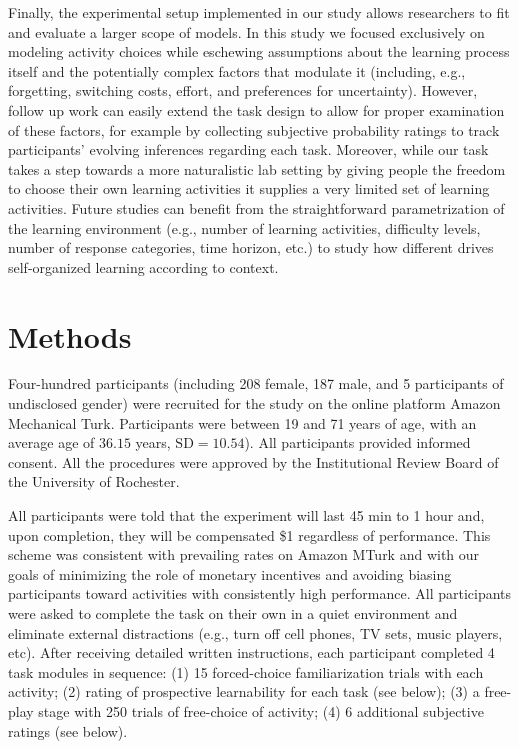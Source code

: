     Finally, the experimental setup implemented in our study allows researchers to fit and evaluate a larger scope of models. In this study we focused exclusively on modeling activity choices while eschewing assumptions about the learning process itself and the potentially complex factors that modulate it (including, e.g., forgetting, switching costs, effort, and preferences for uncertainty). However, follow up work can easily extend the task design to allow for proper examination of these factors, for example by collecting subjective probability ratings to track participants' evolving inferences regarding each task. Moreover, while our task takes a step towards a more naturalistic lab setting by giving people the freedom to choose their own learning activities it supplies a very limited set of learning activities. Future studies can benefit from the straightforward parametrization of the learning environment  (e.g., number of learning activities, difficulty levels, number of response categories, time horizon, etc.) to study how different drives self-organized learning according to context.

\section{Methods}\label{sec:methods}
    Four-hundred participants (including 208 female, 187 male, and 5 participants of undisclosed gender) were recruited for the study on the online platform Amazon Mechanical Turk. Participants were between 19 and 71 years of age, with an average age of $36.15$ years, $\text{SD} = 10.54$). All participants provided informed consent. All the procedures were approved by the Institutional Review Board of the University of Rochester.
    
    All participants were told that the experiment will last 45 min to 1 hour and, upon completion, they will be compensated \$1 regardless of performance. This scheme was consistent with prevailing rates on Amazon MTurk and with our goals of minimizing the role of monetary incentives and avoiding biasing participants toward activities with consistently high performance. All participants were asked to complete the task on their own in a quiet environment and eliminate external distractions (e.g., turn off cell phones, TV sets, music players, etc). After receiving detailed written instructions, each participant completed 4 task modules in sequence: (1) 15 forced-choice familiarization trials with each activity; (2) rating of prospective learnability for each task (see below); (3) a free-play stage with 250 trials of free-choice of activity; (4) 6 additional subjective ratings (see below).
    
